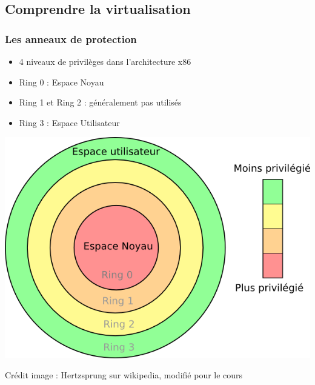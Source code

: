   \subsection{Comprendre la virtualisation}
  \begin{frame}
    \frametitle{Les anneaux de protection}
    \begin{itemize}
      \item 4 niveaux de privilèges dans l'architecture x86
      \item Ring 0 : Espace Noyau
      \item Ring 1 et Ring 2 : généralement pas utilisés
      \item Ring 3 : Espace Utilisateur
    \end{itemize}
    
    \begin{center}
      \includegraphics[height=0.5\textheight]{images/Priv_rings.png}
      
      {\tiny Crédit image : \og Hertzsprung \fg{} sur wikipedia, modifié pour le cours}
    \end{center}
  \end{frame}
  
